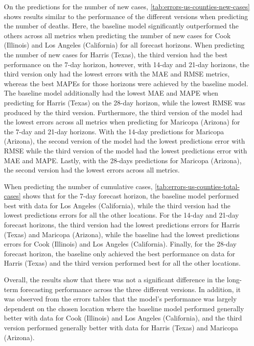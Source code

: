 On the predictions for the number of new cases, \autoref{tab:errors-us-counties-new-cases} shows results similar to the performance of the different versions when predicting the number of deaths.
Here, the baseline model significantly outperformed the others across all metrics when predicting the number of new cases for Cook (Illinois) and Los Angeles (California) for all forecast horizons.
When predicting the number of new cases for Harris (Texas), the third version had the best performance on the 7-day horizon, however, with 14-day and 21-day horizons, the third version only had the lowest errors with the \gls{MAE} and \gls{RMSE} metrics, whereas the best \glspl{MAPE} for those horizons were achieved by the baseline model.
The baseline model additionally had the lowest \gls{MAE} and \gls{MAPE} when predicting for Harris (Texas) on the 28-day horizon, while the lowest \gls{RMSE} was produced by the third version.
Furthermore, the third version of the model had the lowest errors across all metrics when predicting for Maricopa (Arizona) for the 7-day and 21-day horizons.
With the 14-day predictions for Maricopa (Arizona), the second version of the model had the lowest predictions error with \gls{RMSE} while the third version of the model had the lowest predictions error with \gls{MAE} and \gls{MAPE}.
Lastly, with the 28-days predictions for Maricopa (Arizona), the second version had the lowest errors across all metrics.

When predicting the number of cumulative cases, \autoref{tab:errors-us-counties-total-cases} shows that for the 7-day forecast horizon, the baseline model performed best with data for Los Angeles (California), while the third version had the lowest predictions errors for all the other locations.
For the 14-day and 21-day forecast horizons, the third version had the lowest predictions errors for Harris (Texas) and Maricopa (Arizona), while the baseline had the lowest predictions errors for Cook (Illinois) and Los Angeles (California).
Finally, for the 28-day forecast horizon, the baseline only achieved the best performance on data for Harris (Texas) and the third version performed best for all the other locations.

Overall, the results show that there was not a significant difference in the long-term forecasting performance across the three different versions.
In addition, it was observed from the errors tables that the model's performance was largely dependent on the chosen location where the baseline model performed generally better with data for Cook (Illinois) and Los Angeles (California), and the third version performed generally better with data for Harris (Texas) and Maricopa (Arizona).

